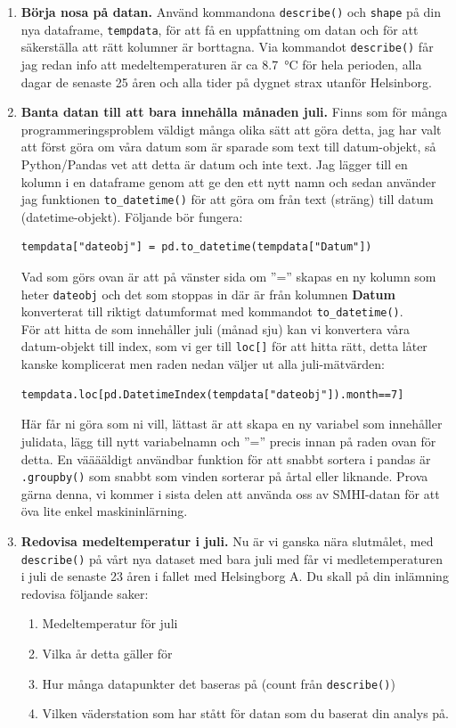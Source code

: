 \documentclass{article}
\begin{document}
\begin{enumerate}
    \item \textbf{Börja nosa på datan.} Använd kommandona \verb+describe()+ och \verb+shape+ på din nya dataframe, \verb+tempdata+, för att få en uppfattning om datan och för att säkerställa att rätt kolumner är borttagna.  Via kommandot \verb+describe()+ får jag redan info att medeltemperaturen är ca \SI{8.7}{\celsius} för hela perioden, alla dagar de senaste 25 åren och alla tider på dygnet strax utanför Helsinborg.
    \item \textbf{Banta datan till att bara innehålla månaden juli.} Finns som för många programmeringsproblem väldigt många olika sätt att göra detta, jag har valt att först göra om våra datum som är sparade som text till datum-objekt, så Python/Pandas vet att detta är datum och inte text. Jag lägger till en kolumn i en dataframe genom att ge den ett nytt namn och sedan använder jag funktionen \verb+to_datetime()+ för att göra om från text (sträng) till datum (datetime-objekt). Följande bör fungera:
    \begin{verbatim}
tempdata["dateobj"] = pd.to_datetime(tempdata["Datum"])        
    \end{verbatim}
    Vad som görs ovan är att på vänster sida om ”=” skapas en ny kolumn som heter \verb+dateobj+ och det som stoppas in där är från kolumnen \textbf{Datum} konverterat till riktigt datumformat med kommandot \verb+to_datetime()+.\\
    För att hitta de som innehåller juli (månad sju) kan vi konvertera våra datum-objekt till index, som vi ger till \verb+loc[]+ för att hitta rätt, detta låter kanske komplicerat men raden nedan väljer ut alla juli-mätvärden:
\begin{verbatim}
tempdata.loc[pd.DatetimeIndex(tempdata["dateobj"]).month==7]
\end{verbatim}        
Här får ni göra som ni vill, lättast är att skapa en ny variabel som innehåller julidata, lägg till nytt variabelnamn och ”=” precis innan på raden ovan för detta. En vääääldigt användbar funktion för att snabbt sortera i pandas är \verb+.groupby()+ som snabbt som vinden sorterar på årtal eller liknande. Prova gärna denna, vi kommer i sista delen att använda oss av SMHI-datan för att öva lite enkel maskininlärning.
\item \textbf{Redovisa medeltemperatur i juli.} Nu är vi ganska nära slutmålet, med \verb+describe()+ på vårt nya dataset med bara juli med får vi medletemperaturen i juli de senaste 23 åren i fallet med Helsingborg A. Du skall på din inlämning redovisa följande saker:
\begin{enumerate}
    \item Medeltemperatur för juli
    \item Vilka år detta gäller för
    \item Hur många datapunkter det baseras på (count från \verb+describe()+)
    \item Vilken väderstation som har stått för datan som du baserat din analys på.
\end{enumerate}


\end{enumerate}
\end{document}
